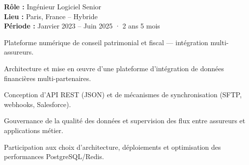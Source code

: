 \begin{cvgroup}

\begin{cvmetadata}
\textbf{Rôle :} Ingénieur Logiciel Senior \\
\textbf{Lieu :} Paris, France – Hybride \\
\textbf{Période :} Janvier 2023 – Juin 2025 · 2 ans 5 mois
\end{cvmetadata}

\begin{cvprojectsummary}
Plateforme numérique de conseil patrimonial et fiscal — intégration multi-assureurs.
\end{cvprojectsummary}


\begin{cvdetailmissions}
  \item {Architecture et mise en œuvre d'une plateforme d'intégration de données financières multi-partenaires.}
  \item {Conception d'API REST (JSON) et de mécanismes de synchronisation (SFTP, webhooks, Salesforce).}
  \item {Gouvernance de la qualité des données et supervision des flux entre assureurs et applications métier.}
  \item {Participation aux choix d'architecture, déploiements et optimisation des performances PostgreSQL/Redis.}
\end{cvdetailmissions}

\end{cvgroup}


